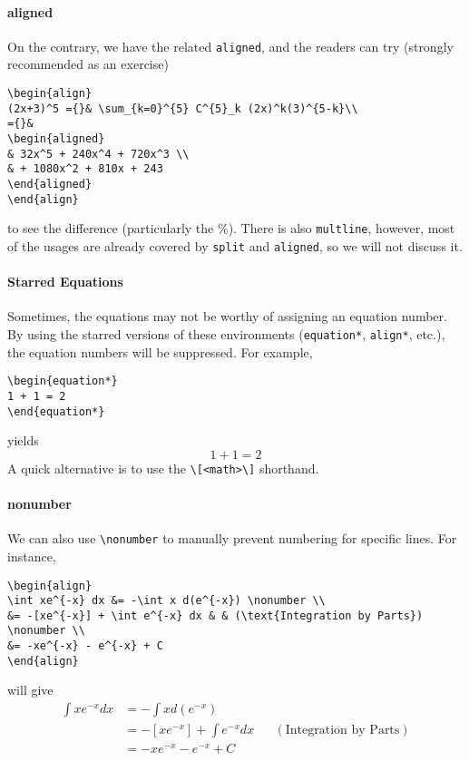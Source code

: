 \paragraph{aligned}
On the contrary, we have the related \texttt{aligned}, and the readers can try (strongly recommended as an exercise)
\begin{lstlisting}
\begin{align}
(2x+3)^5 ={}& \sum_{k=0}^{5} C^{5}_k (2x)^k(3)^{5-k}\\
={}&
\begin{aligned}
& 32x^5 + 240x^4 + 720x^3 \\  
& + 1080x^2 + 810x + 243
\end{aligned}    
\end{align}
\end{lstlisting}
to see the difference (particularly the $\%$). There is also \texttt{multline}, however, most of the usages are already covered by \texttt{split} and \texttt{aligned}, so we will not discuss it.

\paragraph{Starred Equations}
Sometimes, the equations may not be worthy of assigning an equation number. By using the starred versions of these environments (\texttt{equation*}, \texttt{align*}, etc.), the equation numbers will be suppressed. For example,
\begin{lstlisting}
\begin{equation*}
1 + 1 = 2
\end{equation*}
\end{lstlisting}
yields
\begin{equation*}
1 + 1 = 2
\end{equation*}
A quick alternative is to use the \verb|\[<math>\]| shorthand.

\paragraph{nonumber}
We can also use \texttt{\textbackslash nonumber} to manually prevent numbering for specific lines. For instance,
\begin{lstlisting}
\begin{align}
\int xe^{-x} dx &= -\int x d(e^{-x}) \nonumber \\
&= -[xe^{-x}] + \int e^{-x} dx & & (\text{Integration by Parts}) \nonumber \\
&= -xe^{-x} - e^{-x} + C 
\end{align}
\end{lstlisting}
will give
\begin{align}
\int xe^{-x} dx &= -\int x d(e^{-x}) \nonumber \\
&= -[xe^{-x}] + \int e^{-x} dx & & (\text{Integration by Parts}) \nonumber \\
&= -xe^{-x} - e^{-x} + C \label{eqn:IBP1}
\end{align}

